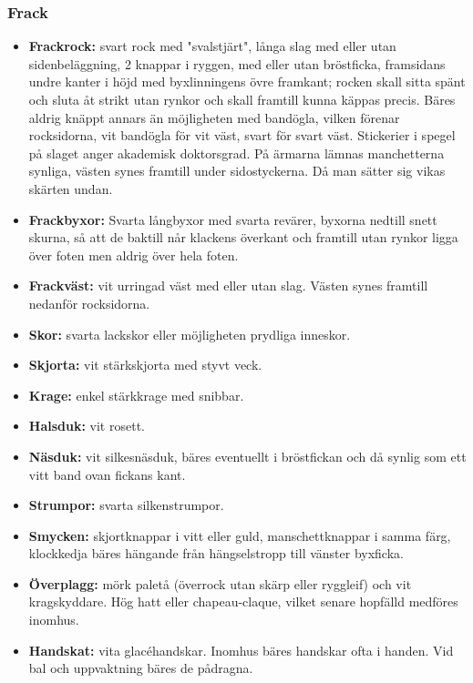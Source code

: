 \subsubsection*{\textbf{Frack}}
\begin{itemize}

    \item[]\textbf{Frackrock:} svart rock med "svalstjärt", långa slag med eller utan sidenbeläggning, 2 knappar i ryggen, med eller utan bröstficka, framsidans undre kanter i höjd med byxlinningens övre framkant; rocken skall sitta spänt och sluta åt strikt utan rynkor och skall framtill kunna käppas precis. Bäres aldrig knäppt annars än möjligheten med bandögla, vilken förenar rocksidorna, vit bandögla för vit väst, svart för svart väst. Stickerier i spegel på slaget anger akademisk doktorsgrad. På ärmarna lämnas manchetterna synliga, västen synes framtill under sidostyckerna. Då man sätter sig vikas skärten undan.

    \item[]\textbf{Frackbyxor:} Svarta långbyxor med svarta revärer, byxorna nedtill snett skurna, så att de baktill når klackens överkant och framtill utan rynkor ligga över foten men aldrig över hela foten.

    \item[]\textbf{Frackväst:} vit urringad väst med eller utan slag. Västen synes framtill nedanför rocksidorna.

    \item[]\textbf{Skor:} svarta lackskor eller möjligheten prydliga inneskor.

    \item[]\textbf{Skjorta:} vit stärkskjorta med styvt veck.

    \item[]\textbf{Krage:} enkel stärkkrage med snibbar.

    \item[]\textbf{Halsduk:} vit rosett.

    \item[]\textbf{Näsduk:} vit silkesnäsduk, bäres eventuellt i bröstfickan och då synlig som ett vitt band ovan fickans kant.

    \item[]\textbf{Strumpor:} svarta silkenstrumpor.

    \item[]\textbf{Smycken:} skjortknappar i vitt eller guld, manschettknappar i samma färg, klockkedja bäres hängande från hängselstropp till vänster byxficka.

    \item[]\textbf{Överplagg:} mörk paletå (överrock utan skärp eller ryggleif) och vit kragskyddare. Hög hatt eller chapeau-claque, vilket senare hopfälld medföres inomhus.

    \item[]\textbf{Handskat:} vita glacéhandskar. Inomhus bäres handskar ofta i handen. Vid bal och uppvaktning bäres de pådragna.

\end{itemize}

